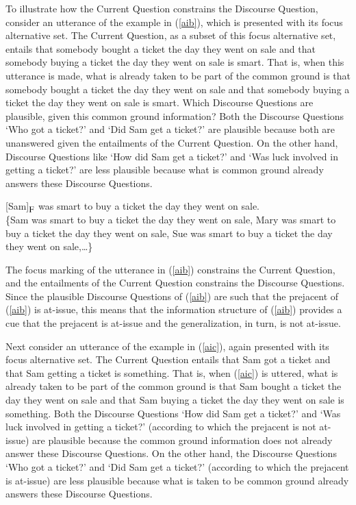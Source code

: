 \documentclass[11pt,fleqn]{article}
\newcommand{\foc}{$_{\mbox{\small F}}$}
\newcommand{\6}{\mbox{$[\hspace*{-.6mm}[$}}
\newcommand{\9}{\mbox{$]\hspace*{-.6mm}]$}}
\begin{document}
To illustrate how the Current Question constrains the Discourse Question, consider an utterance of the example in (\ref{aib}), which is presented with its focus alternative set. The Current Question, as a subset of this focus alternative set, entails that somebody bought a ticket the day they went on sale and that somebody buying a ticket the day they went on sale is smart. That is, when this utterance is made, what is already taken to be part of the common ground is that somebody bought a ticket the day they went on sale and that somebody buying a ticket the day they went on sale is smart. Which Discourse Questions are plausible, given this common ground information? Both the Discourse Questions `Who got a ticket?' and `Did Sam get a ticket?' are plausible because both are unanswered given the entailments of the Current Question. On the other hand, Discourse Questions like `How did Sam get a ticket?' and `Was luck involved in getting a ticket?' are less plausible because what is common ground already answers these Discourse Questions.

\begin{exe}
\ex\label{aib} {[}Sam]\foc{} was smart to buy a ticket the day they went on sale.
\\ \{Sam was smart to buy a ticket the day they went on sale, Mary was smart to buy a ticket the day they went on sale, Sue was smart to buy a ticket the day they went on sale,\ldots\}
\end{exe}
The focus marking of the utterance in (\ref{aib}) constrains the Current Question, and the entailments of the Current Question constrains the Discourse Questions. Since the plausible Discourse Questions of (\ref{aib}) are such that the prejacent of (\ref{aib}) is at-issue, this means that the information structure of (\ref{aib}) provides a cue that the prejacent is at-issue and the generalization, in turn, is not at-issue.

Next consider an utterance of the example in (\ref{aic}), again presented with its focus alternative set. The Current Question entails that Sam got a ticket and that Sam getting a ticket is something. That is, when (\ref{aic}) is uttered, what is already taken to be part of the common ground is that Sam bought a ticket the day they went on sale and that Sam buying a ticket the day they went on sale is something. Both the Discourse Questions `How did Sam get a ticket?' and `Was luck involved in getting a ticket?' (according to which the prejacent is not at-issue) are plausible because the common ground information does not already answer these Discourse Questions. On the other hand, the Discourse Questions `Who got a ticket?' and `Did Sam get a ticket?' (according to which the prejacent is at-issue) are less plausible because what is taken to be common ground already answers these Discourse Questions. 
\end{document}
